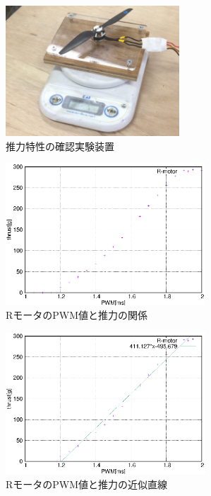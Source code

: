 \documentclass[12pt,oneside]{sotsuken_paper}
\begin{document}
\begin{figure}[htbp]
	\begin{center}
		\includegraphics[width=65mm]{image/thrust/thrust-test.jpg}
		\caption{推力特性の確認実験装置}
		\label{fig:thrust-test}
	\end{center}
\end{figure}

\begin{figure}[htbp]
	\begin{center}
		\includegraphics[width=75mm]{image/thrust/thrust-R.eps}
		\caption{RモータのPWM値と推力の関係}
		\label{fig:thrust-R}
	\end{center}
\end{figure}

\begin{figure}[htbp]
	\begin{center}
		\includegraphics[width=75mm]{image/thrust/thrust-R-kinji.eps}
		\caption{RモータのPWM値と推力の近似直線}
		\label{fig:thrust-R-kinji}
	\end{center}
\end{figure}
\end{document}
